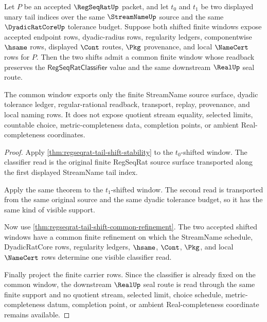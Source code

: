 \begin{theorem}
\label{thm:regseqrat-tail-shift-window-stability}
Let $P$ be an accepted $\RegSeqRatUp$ packet, and let $t_0$ and $t_1$ be two
displayed unary tail indices over the same $\StreamNameUp$ source and the same
$\DyadicRatCoreUp$ tolerance budget. Suppose both shifted finite windows expose
accepted endpoint rows, dyadic-radius rows, regularity ledgers, componentwise
$\hsame$ rows, displayed $\Cont$ routes, $\Pkg$ provenance, and local
$\NameCert$ rows for $P$. Then the two shifts admit a common finite window
whose readback preserves the $\mathsf{RegSeqRatClassifier}$ value and the
same downstream $\RealUp$ seal route.

The common window exports only the finite StreamName source surface, dyadic
tolerance ledger, regular-rational readback, transport, replay, provenance, and
local naming rows. It does not expose quotient stream equality, selected
limits, countable choice, metric-completeness data, completion points, or
ambient Real-completeness coordinates.
\end{theorem}
\begin{proof}
Apply \autoref{thm:regseqrat-tail-shift-stability} to the $t_0$-shifted
window. The classifier read is the original finite RegSeqRat source surface
transported along the first displayed StreamName tail index.

Apply the same theorem to the $t_1$-shifted window. The second read is
transported from the same original source and the same dyadic tolerance budget,
so it has the same kind of visible support.

Now use \autoref{thm:regseqrat-tail-shift-common-refinement}. The two accepted
shifted windows have a common finite refinement on which the StreamName
schedule, DyadicRatCore rows, regularity ledgers, $\hsame$, $\Cont$, $\Pkg$,
and local $\NameCert$ rows determine one visible classifier read.

Finally project the finite carrier rows. Since the classifier is already fixed
on the common window, the downstream $\RealUp$ seal route is read through the
same finite support and no quotient stream, selected limit, choice schedule,
metric-completeness datum, completion point, or ambient Real-completeness
coordinate remains available.
\end{proof}

